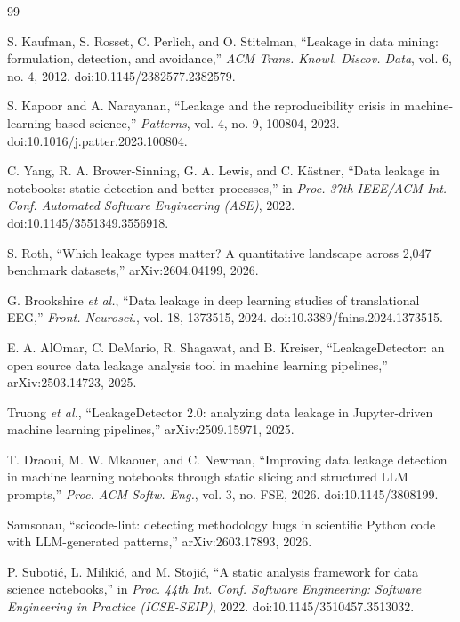 \documentclass[10pt,a4paper,twocolumn]{article}
\begin{document}
\begin{thebibliography}{99}
\scriptsize
\setlength{\itemsep}{0pt}\setlength{\parsep}{0pt}

 S. Kaufman, S. Rosset, C. Perlich, and O. Stitelman, ``Leakage in data mining: formulation,
detection, and avoidance,'' \emph{ACM Trans. Knowl. Discov. Data}, vol. 6, no. 4, 2012.
doi:10.1145/2382577.2382579.

 S. Kapoor and A. Narayanan, ``Leakage and the reproducibility crisis in
machine-learning-based science,'' \emph{Patterns}, vol. 4, no. 9, 100804, 2023. doi:10.1016/j.patter.2023.100804.

 C. Yang, R. A. Brower-Sinning, G. A. Lewis, and C. K\"{a}stner, ``Data leakage in notebooks:
static detection and better processes,'' in \emph{Proc. 37th IEEE/ACM Int. Conf. Automated Software Engineering
(ASE)}, 2022. doi:10.1145/3551349.3556918.

 S. Roth, ``Which leakage types matter? A quantitative landscape across 2,047 benchmark
datasets,'' arXiv:2604.04199, 2026.

 G. Brookshire \emph{et al.}, ``Data leakage in deep learning studies of translational
EEG,'' \emph{Front. Neurosci.}, vol. 18, 1373515, 2024. doi:10.3389/fnins.2024.1373515.

 E. A. AlOmar, C. DeMario, R. Shagawat, and B. Kreiser, ``LeakageDetector: an open source
data leakage analysis tool in machine learning pipelines,'' arXiv:2503.14723, 2025.

 Truong \emph{et al.}, ``LeakageDetector 2.0: analyzing data leakage in Jupyter-driven
machine learning pipelines,'' arXiv:2509.15971, 2025.

 T. Draoui, M. W. Mkaouer, and C. Newman, ``Improving data leakage detection in machine
learning notebooks through static slicing and structured LLM prompts,'' \emph{Proc. ACM Softw. Eng.}, vol. 3,
no. FSE, 2026. doi:10.1145/3808199.

 Samsonau, ``scicode-lint: detecting methodology bugs in scientific Python code with
LLM-generated patterns,'' arXiv:2603.17893, 2026.

 P. Suboti\'{c}, L. Miliki\'{c}, and M. Stoji\'{c}, ``A static analysis framework for data
science notebooks,'' in \emph{Proc. 44th Int. Conf. Software Engineering: Software Engineering in Practice
(ICSE-SEIP)}, 2022. doi:10.1145/3510457.3513032.


\end{thebibliography}
\end{document}
